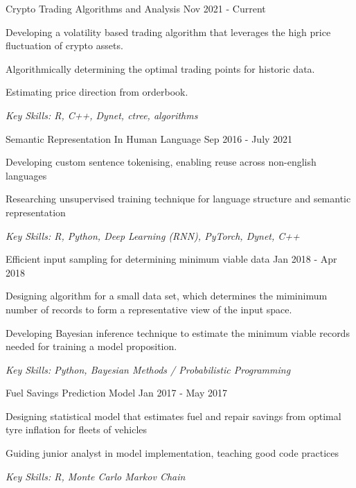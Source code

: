 \documentclass[11pt,article,oneside]{memoir}
\newenvironment{itemize*}{%
  \renewcommand\labelitemi{\textbullet}
  \footnotesize
  \begin{itemize}%
    \setlength{\itemsep}{0pt}}%
  {\end{itemize}
}
\begin{document}

\normalsize
\medskip
\ind Crypto Trading Algorithms and Analysis \hfill Nov 2021 - Current
\begin{itemize*}
  \item Developing a volatility based trading algorithm that leverages the high price fluctuation of crypto assets.
  \item Algorithmically determining the optimal trading points for historic data. 
  \item Estimating price direction from orderbook.
\end{itemize*}
\ind \hspace{0.35in} \footnotesize \emph{Key Skills: R, C++, Dynet, ctree, algorithms }

\normalsize
\medskip
\ind Semantic Representation In Human Language \hfill Sep 2016 - July 2021
\begin{itemize*}
  \item Developing custom sentence tokenising, enabling reuse across non-english languages
  \item Researching unsupervised training technique for language structure and semantic representation
\end{itemize*}
\ind \hspace{0.35in} \footnotesize \emph{Key Skills: R, Python, Deep Learning (RNN), PyTorch, Dynet, C++}

\normalsize
\medskip
\ind Efficient input sampling for determining minimum viable data \hfill Jan 2018 - Apr 2018
\begin{itemize*}
  \item Designing algorithm for a small data set, which determines the miminimum number of records to form a representative view of the input space.
  \item Developing Bayesian inference technique to estimate the minimum viable records needed for training a model proposition.
\end{itemize*}
\ind \hspace{0.35in} \footnotesize \emph{Key Skills: Python, Bayesian Methods / Probabilistic Programming}

\normalsize
\medskip
\ind Fuel Savings Prediction Model \hfill Jan 2017 - May 2017
\begin{itemize*}
  \item Designing statistical model that estimates fuel and repair savings from optimal tyre inflation for fleets of vehicles
  \item Guiding junior analyst in model implementation, teaching good code practices
\end{itemize*}
\ind \hspace{0.35in} \footnotesize \emph{Key Skills: R, Monte Carlo Markov Chain}
\end{document}
